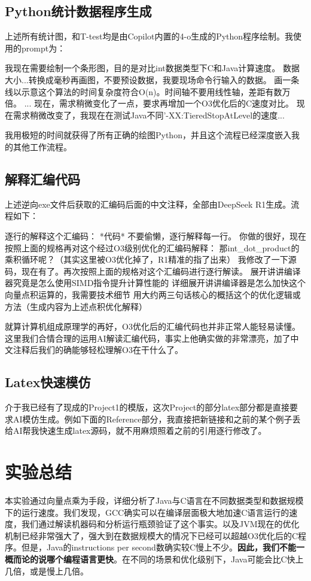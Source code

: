 \documentclass[11pt]{article}
\begin{document}
\subsection{Python统计数据程序生成}
上述所有统计图，和T-test均是由Copilot内置的4-o生成的Python程序绘制。我使用的prompt为：
\begin{codeline}
我现在需要绘制一个条形图，目的是对比int数据类型下C和Java计算速度。
数据大小...转换成毫秒再画图，不要预设数据，我要现场命令行输入的数据。
画一条线以示意这个算法的时间复杂度符合O(n)。时间轴不要用线性轴，差距有数万倍。
...
现在，需求稍微变化了一点，要求再增加一个O3优化后的C速度对比。
现在需求稍微改变了，我现在在测试Java不同'-XX:TieredStopAtLevel的速度...
\end{codeline}
我用极短的时间就获得了所有正确的绘图Python，并且这个流程已经深度嵌入我的其他工作流程。
\subsection{解释汇编代码}
上述逆向exe文件后获取的汇编码后面的中文注释，全部由DeepSeek R1生成。流程如下：
\begin{codeline}
    逐行的解释这个汇编码： *代码*
    不要偷懒，逐行解释每一行。
    你做的很好，现在按照上面的规格再对这个经过O3级别优化的汇编码解释：
    那int_dot_product的乘积循环呢？（其实这里被O3优化掉了，R1精准的指了出来）
    我修改了一下源码，现在有了。再次按照上面的规格对这个汇编码进行逐行解读。
    展开讲讲编译器究竟是怎么使用SIMD指令提升计算性能的
    详细展开讲讲编译器是怎么加快这个向量点积运算的，我需要技术细节
    用大约两三句话核心的概括这个的优化逻辑或方法（生成内容为上述点积优化解释）
\end{codeline}
就算计算机组成原理学的再好，O3优化后的汇编代码也并非正常人能轻易读懂。这里我们合情合理的运用AI解读汇编代码，事实上他确实做的非常漂亮，加了中文注释后我们的确能够轻松理解O3在干什么了。
\subsection{Latex快速模仿}
介于我已经有了现成的Project1的模版，这次Project的部分latex部分都是直接要求AI模仿生成。例如下面的Reference部分，我直接把新链接和之前的某个例子丢给AI帮我快速生成latex源码，就不用麻烦照着之前的引用逐行修改了。
\section{实验总结}
本实验通过向量点乘为手段，详细分析了Java与C语言在不同数据类型和数据规模下的运行速度。我们发现，GCC确实可以在编译层面极大地加速C语言运行的速度，我们通过解读机器码和分析运行瓶颈验证了这个事实。以及JVM现在的优化机制已经非常强大了，强大到在数据规模大的情况下已经可以超越O3优化后的C程序。但是，Java的instructions per second数确实较C慢上不少。\textbf{因此，我们不能一概而论的说哪个编程语言更快}。在不同的场景和优化级别下，Java可能会比C快上几倍，或是慢上几倍。
\end{document}
